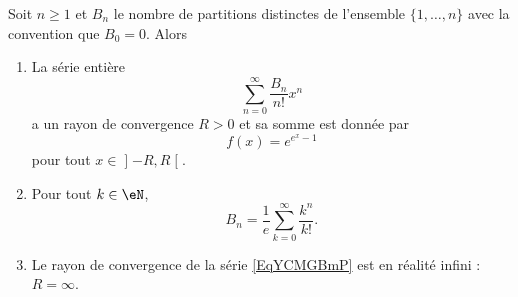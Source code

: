 \begin{theorem}  \label{ThoYFAzwSg}
    Soit \( n\geq 1\) et \( B_n\) le nombre de partitions distinctes de l'ensemble \( \{ 1,\ldots, n \}\) avec la convention que \( B_0=0\). Alors
    \begin{enumerate}
        \item
            La série entière
            \begin{equation}    \label{EqYCMGBmP}
                \sum_{n=0}^{\infty}\frac{ B_n }{ n! }x^n
            \end{equation}
            a un rayon de convergence \( R>0\) et sa somme est donnée par
            \begin{equation}
                f(x)= e^{ e^{x}-1}
            \end{equation}
            pour tout \( x\in\mathopen] -R , R \mathclose[\).
        \item
            Pour tout \( k\in \eN\),
            \begin{equation}
                B_n=\frac{1}{ e }\sum_{k=0}^{\infty}\frac{ k^n }{ k! }.
            \end{equation}
            \item
                Le rayon de convergence de la série \eqref{EqYCMGBmP} est en réalité infini : \( R=\infty\).
    \end{enumerate}
\end{theorem}

